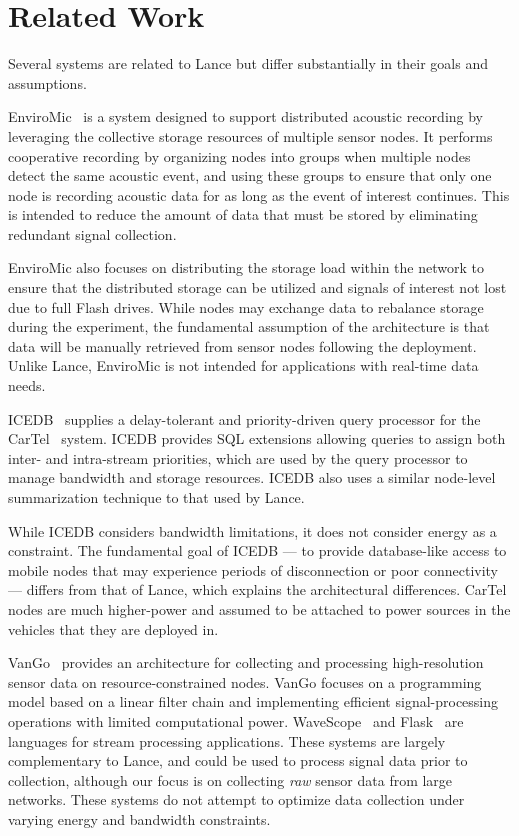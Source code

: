 \section{Related Work}
\label{lance-sec-related}

Several systems are related to Lance but differ substantially in their goals
and assumptions.

EnviroMic~\cite{enviromic} is a system designed to support distributed
acoustic recording by leveraging the collective storage resources of multiple
sensor nodes. It performs cooperative recording by organizing nodes into
groups when multiple nodes detect the same acoustic event, and using these
groups to ensure that only one node is recording acoustic data for as long as
the event of interest continues. This is intended to reduce the amount of
data that must be stored by eliminating redundant signal collection.

EnviroMic also focuses on distributing the storage load within the network to
ensure that the distributed storage can be utilized and signals of interest
not lost due to full Flash drives. While nodes may exchange data to rebalance
storage during the experiment, the fundamental assumption of the architecture
is that data will be manually retrieved from sensor nodes following the
deployment. Unlike Lance, EnviroMic is not intended for applications with
real-time data needs.

ICEDB~\cite{zhang2007icedb} supplies a delay-tolerant and priority-driven
query processor for the CarTel~\cite{cartel} system. ICEDB provides SQL
extensions allowing queries to assign both inter- and intra-stream
priorities, which are used by the query processor to manage bandwidth and
storage resources. ICEDB also uses a similar node-level summarization
technique to that used by Lance.

While ICEDB considers bandwidth limitations, it does not consider energy as a
constraint. The fundamental goal of ICEDB --- to provide database-like access
to mobile nodes that may experience periods of disconnection or poor
connectivity --- differs from that of Lance, which explains the architectural
differences. CarTel nodes are much higher-power and assumed to be attached to
power sources in the vehicles that they are deployed in.

VanGo~\cite{vango} provides an architecture for collecting and processing
high-resolution sensor data on resource-constrained nodes. VanGo focuses on a
programming model based on a linear filter chain and implementing efficient
signal-processing operations with limited computational power.
WaveScope~\cite{wavescope} and Flask~\cite{flask-tr} are languages for stream
processing applications. These systems are largely complementary to Lance,
and could be used to process signal data prior to collection, although our
focus is on collecting \textit{raw} sensor data from large networks. These
systems do not attempt to optimize data collection under varying energy and
bandwidth constraints. 
